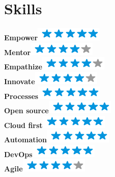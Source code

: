 \documentclass[]{friggeri-cv}
\begin{document}
\section{Skills}
\begin{flushright}
\begin{multicols}{3}
   \textbf{Empower}\includegraphics[scale=0.40]{img/5stars.png}\\
    \textbf{Mentor}\includegraphics[scale=0.40]{img/4stars.png}\\
  \textbf{Empathize}\includegraphics[scale=0.40]{img/4stars.png}\\
  \textbf{Innovate}\includegraphics[scale=0.40]{img/4stars.png}\\
    \textbf{Processes}\includegraphics[scale=0.40]{img/5stars.png}\\
    \textbf{Open source}\includegraphics[scale=0.40]{img/5stars.png}\\
    \textbf{Cloud first}\includegraphics[scale=0.40]{img/5stars.png}\\
    \textbf{Automation}\includegraphics[scale=0.40]{img/5stars.png}\\
    \textbf{DevOps}\includegraphics[scale=0.40]{img/5stars.png}\\
    \textbf{Agile}\includegraphics[scale=0.40]{img/4stars.png}\\

\end{multicols}
\end{flushright}
\end{document}
